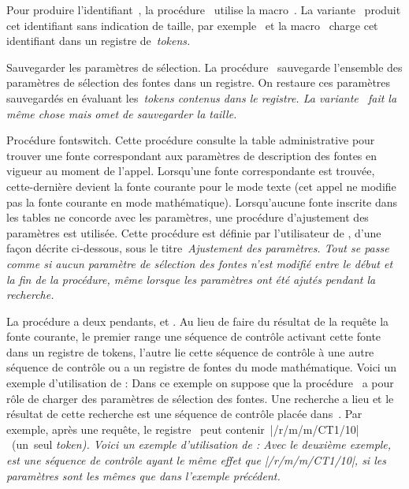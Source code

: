 Pour produire l'identifiant~\li{\setAltHelvetica\fontname}, la
procédure~ utilise la macro~. La
variante~ produit cet identifiant sans indication de
taille, par exemple~\li{\setAltHelvetica\fontshortname} et la
macro~ charge cet identifiant dans un
registre de~\em{tokens}.

\formalpar Sauvegarder les paramètres de sélection.
La procédure~ sauvegarde l'ensemble des
paramètres de sélection des fontes dans un registre. On restaure ces
paramètres sauvegardés en évaluant les~\em{tokens} contenus dans le
registre.  La variante~ fait la même chose
mais omet de sauvegarder la taille.

\formalpar Procédure fontswitch.  Cette procédure consulte la table
administrative pour trouver une fonte correspondant aux paramètres de
description des fontes en vigueur au moment de l'appel. Lorsqu'une
fonte correspondante est trouvée, cette-dernière devient la fonte
courante pour le mode texte (cet appel ne modifie pas la fonte
courante en mode mathématique).  Lorsqu'aucune fonte inscrite dans les
tables ne concorde avec les paramètres, une procédure d'ajustement des
paramètres est utilisée. Cette procédure est définie par l'utilisateur
de , d'une façon décrite ci-dessous, sous le
titre~\em{Ajustement des paramètres}. Tout se passe comme si aucun
paramètre de sélection des fontes n'est modifié entre le début et la
fin de la procédure, même lorsque les paramètres ont été ajutés
pendant la recherche.

La procédure  a deux pendants, 
et . Au lieu de faire du résultat de la requête
la fonte courante, le premier range une séquence de contrôle activant
cette fonte dans un registre de tokens, l'autre lie cette séquence de
contrôle à une autre séquence de contrôle ou a un registre de fontes
du mode mathématique. Voici un exemple d'utilisation de
:
\beginverbatim
\toksloadfontswitch\setsectionfont\to\rtA
\endverbatim
\noindent
Dans ce exemple on suppose que la procédure~ a pour
rôle de charger des paramètres de sélection des fontes. Une recherche
a lieu et le résultat de cette recherche est une séquence de contrôle
placée dans~. Par exemple, après une requête, le
registre~ peut contenir~|\txss/r/m/m/CT1/10|~(un~seul
\em{token}).
Voici un exemple d'utilisation de :
\beginverbatim
\fontloadfontswitch\setsectionfont{}
\fontloadfontswitch\setsectionfont\to\shorthand
\endverbatim
Avec le deuxième exemple,~ est une séquence de contrôle
ayant le même effet que |\txss/r/m/m/CT1/10|, si les paramètres sont
les mêmes que dans l'exemple précédent.

